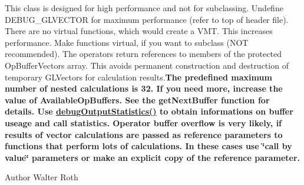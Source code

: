 \-This class is designed for high performance and not for subclassing. \-Undefine \-D\-E\-B\-U\-G\-\_\-\-G\-L\-V\-E\-C\-T\-O\-R for maximum performance (refer to top of header file). \-There are no virtual functions, which would create a \-V\-M\-T. \-This increases performance. \-Make functions virtual, if you want to subclass (\-N\-O\-T recommended). \-The operators return references to members of the protected \-Op\-Buffer\-Vectors array. \-This avoids permanent construction and destruction of temporary \-G\-L\-Vectors for calculation results.{\bfseries  \-The predefined maximum number of nested calculations is 32. \-If you need more, increase the value of \-Available\-Op\-Buffers. \-See the get\-Next\-Buffer function for details. \-Use \hyperlink{classGLVector_add2a39dc176e05b68c02375fb674820e}{debug\-Output\-Statistics()} to obtain informations on buffer useage and call statistics. \-Operator buffer overflow is very likely, if results of vector calculations are passed as reference parameters to functions that perform lots of calculations. \-In these cases use \char`\"{}call by value\char`\"{} parameters or make an explicit copy of the reference parameter. } \begin{DoxyAuthor}{\-Author}
\-Walter \-Roth 
\end{DoxyAuthor}



